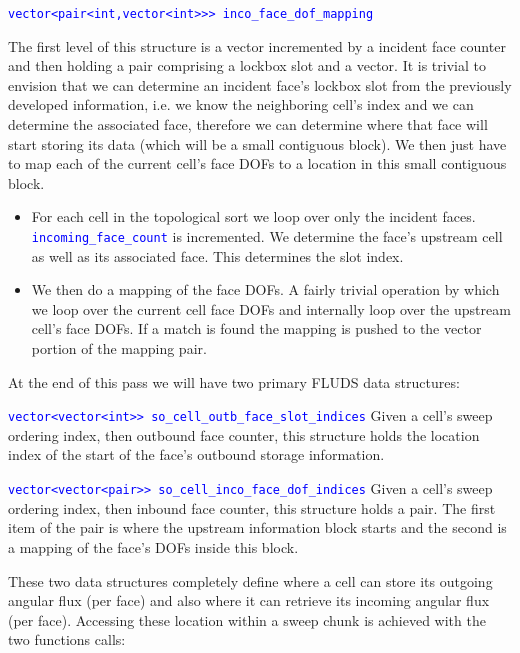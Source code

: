 \documentclass[11pt,letterpaper,titlepage]{article}
\newcommand{\xmltag}[1]{\textcolor{blue}{ \texttt{#1}} }
\numberwithin{equation}{section}
\begin{document}
\xmltag{vector<pair<int,vector<int>>> inco\_face\_dof\_mapping}\newline

The first level of this structure is a vector incremented by a incident face counter and then holding a pair comprising a lockbox slot and a vector. It is trivial to envision that we can determine an incident face's lockbox slot from the previously developed information, i.e. we know the neighboring cell's index and we can determine the associated face, therefore we can determine where that face will start storing its data (which will be a small contiguous block). We then just have to map each of the current cell's face DOFs to a location in this small contiguous block.

\begin{itemize}
\item For each cell in the topological sort we loop over only the incident faces. \xmltag{incoming\_face\_count} is incremented. We determine the face's upstream cell as well as its associated face. This determines the slot index.
\item We then do a mapping of the face DOFs. A fairly trivial operation by which we loop over the current cell face DOFs and internally loop over the upstream cell's face DOFs. If a match is found the mapping is pushed to the vector portion of the mapping pair.
\end{itemize}

At the end of this pass we will have two primary FLUDS data structures:
\newline

\xmltag{vector<vector<int>> so\_cell\_outb\_face\_slot\_indices} \newline 
Given a cell's sweep ordering index, then outbound face counter, this structure holds the location index of the start of the face's outbound storage information.\newline

\xmltag{vector<vector<pair>> so\_cell\_inco\_face\_dof\_indices} \newline 
Given a cell's sweep ordering index, then inbound face counter, this structure holds a pair. The first item of the pair is where the upstream information block starts and the second is a mapping of the face's DOFs inside this block.
\newline

These two data structures completely define where a cell can store its outgoing angular flux (per face) and also where it can retrieve its incoming angular flux (per face). Accessing these location within a sweep chunk is achieved with the two functions calls:
\end{document}
